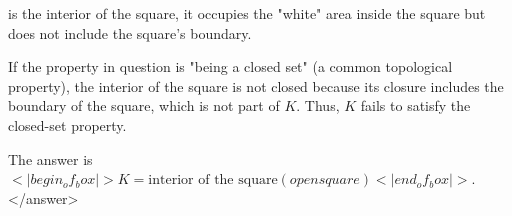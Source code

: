 \) is the interior of the square, it occupies the "white" area inside the square but does not include the square's boundary.  

If the property in question is "being a closed set" (a common topological property), the interior of the square is not closed because its closure includes the boundary of the square, which is not part of \( K \). Thus, \( K \) fails to satisfy the closed-set property.  

The answer is \(<|begin_of_box|>K = \text{interior of the square} (open square)<|end_of_box|>\).</answer>